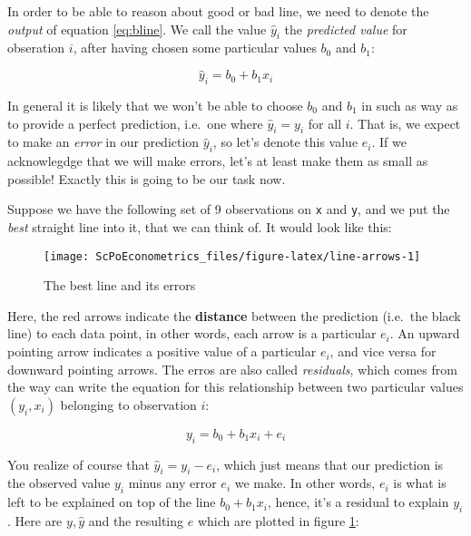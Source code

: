 \documentclass[]{book}
\begin{document}
In order to be able to reason about good or bad line, we need to denote the \emph{output} of equation \eqref{eq:bline}. We call the value \(\hat{y}_i\) the \emph{predicted value} for obseration \(i\), after having chosen some particular values \(b_0\) and \(b_1\):

\begin{equation}
\hat{y}_i = b_0 + b_1 x_i \label{eq:abline-pred}
\end{equation}

In general it is likely that we won't be able to choose \(b_0\) and \(b_1\) in such as way as to provide a perfect prediction, i.e.~one where \(\hat{y}_i = y_i\) for all \(i\). That is, we expect to make an \emph{error} in our prediction \(\hat{y}_i\), so let's denote this value \(e_i\). If we acknowlegdge that we will make errors, let's at least make them as small as possible! Exactly this is going to be our task now.

Suppose we have the following set of 9 observations on \texttt{x} and \texttt{y}, and we put the \emph{best} straight line into it, that we can think of. It would look like this:

\begin{figure}

{\centering \texttt{[image: ScPoEconometrics\_files/figure-latex/line-arrows-1]} 

}

\caption{The best line and its errors}\label{fig:line-arrows}
\end{figure}

Here, the red arrows indicate the \textbf{distance} between the prediction (i.e.~the black line) to each data point, in other words, each arrow is a particular \(e_i\). An upward pointing arrow indicates a positive value of a particular \(e_i\), and vice versa for downward pointing arrows. The erros are also called \emph{residuals}, which comes from the way can write the equation for this relationship between two particular values \((y_i,x_i)\) belonging to observation \(i\):

\begin{equation}
y_i = b_0 + b_1 x_i + e_i \label{eq:abline}
\end{equation}

You realize of course that \(\hat{y}_i = y_i - e_i\), which just means that our prediction is the observed value \(y_i\) minus any error \(e_i\) we make. In other words, \(e_i\) is what is left to be explained on top of the line \(b_0 + b_1 x_i\), hence, it's a residual to explain \(y_i\). Here are \(y,\hat{y}\) and the resulting \(e\) which are plotted in figure \ref{fig:line-arrows}:
\end{document}
